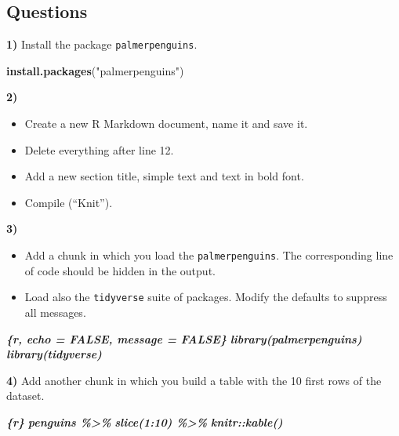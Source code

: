 \documentclass[
  12pt,
]{book}
\newenvironment{Shaded}{\begin{snugshade}}{\end{snugshade}}
\newcommand{\InformationTok}[1]{\textcolor[rgb]{0.56,0.35,0.01}{\textbf{\textit{#1}}}}
\newcommand{\KeywordTok}[1]{\textcolor[rgb]{0.13,0.29,0.53}{\textbf{#1}}}
\newcommand{\NormalTok}[1]{#1}
\newcommand{\StringTok}[1]{\textcolor[rgb]{0.31,0.60,0.02}{#1}}
\providecommand{\tightlist}{%
  \setlength{\itemsep}{0pt}\setlength{\parskip}{0pt}}
\begin{document}
\hypertarget{questions}{%
\subsection{Questions}\label{questions}}

\textbf{1)} Install the package \texttt{palmerpenguins}.

\begin{Shaded}
\begin{Highlighting}[]
\KeywordTok{install.packages}\NormalTok{(}\StringTok{"palmerpenguins"}\NormalTok{)}
\end{Highlighting}
\end{Shaded}

\textbf{2)}

\begin{itemize}
\tightlist
\item
  Create a new R Markdown document, name it and save it.
\item
  Delete everything after line 12.
\item
  Add a new section title, simple text and text in bold font.
\item
  Compile (``Knit'').
\end{itemize}

\textbf{3)}

\begin{itemize}
\tightlist
\item
  Add a chunk in which you load the \texttt{palmerpenguins}. The corresponding line of code should be hidden in the output.
\item
  Load also the \texttt{tidyverse} suite of packages. Modify the defaults to suppress all messages.
\end{itemize}

\begin{Shaded}
\begin{Highlighting}[]
\InformationTok{\textasciigrave{}\textasciigrave{}\textasciigrave{}\{r, echo = FALSE, message = FALSE\}}
\InformationTok{library(palmerpenguins)}
\InformationTok{library(tidyverse)}
\InformationTok{\textasciigrave{}\textasciigrave{}\textasciigrave{}}
\end{Highlighting}
\end{Shaded}

\textbf{4)} Add another chunk in which you build a table with the 10 first rows of the dataset.

\begin{Shaded}
\begin{Highlighting}[]
\InformationTok{\textasciigrave{}\textasciigrave{}\textasciigrave{}\{r\}}
\InformationTok{penguins \%\textgreater{}\%}
\InformationTok{  slice(1:10) \%\textgreater{}\%}
\InformationTok{  knitr::kable()}
\InformationTok{\textasciigrave{}\textasciigrave{}\textasciigrave{}}
\end{Highlighting}
\end{Shaded}
\end{document}
